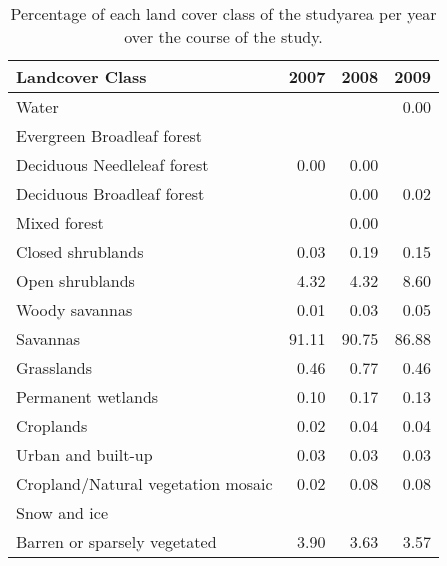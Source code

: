 \begin{table}[H]
\centering
\caption[Percentage of each LC class per year, Ngamiland]{Percentage of each land cover class of the 
                                       studyarea per year over the course of the study.} 
\label{table:mlc_percentage_BWA}
\begin{tabular}{lrrr}
  \toprule
Landcover Class & 2007 & 2008 & 2009 \\ 
  \midrule
Water &  &  & 0.00 \\ 
  Evergreen Broadleaf forest &  &  &  \\ 
  Deciduous Needleleaf forest & 0.00 & 0.00 &  \\ 
  Deciduous Broadleaf forest &  & 0.00 & 0.02 \\ 
  Mixed forest &  & 0.00 &  \\ 
  Closed shrublands & 0.03 & 0.19 & 0.15 \\ 
  Open shrublands & 4.32 & 4.32 & 8.60 \\ 
  Woody savannas & 0.01 & 0.03 & 0.05 \\ 
  Savannas & 91.11 & 90.75 & 86.88 \\ 
  Grasslands & 0.46 & 0.77 & 0.46 \\ 
  Permanent wetlands & 0.10 & 0.17 & 0.13 \\ 
  Croplands & 0.02 & 0.04 & 0.04 \\ 
  Urban and built-up & 0.03 & 0.03 & 0.03 \\ 
  Cropland/Natural vegetation mosaic & 0.02 & 0.08 & 0.08 \\ 
  Snow and ice &  &  &  \\ 
  Barren or sparsely vegetated & 3.90 & 3.63 & 3.57 \\ 
   \bottomrule
\end{tabular}
\end{table}
